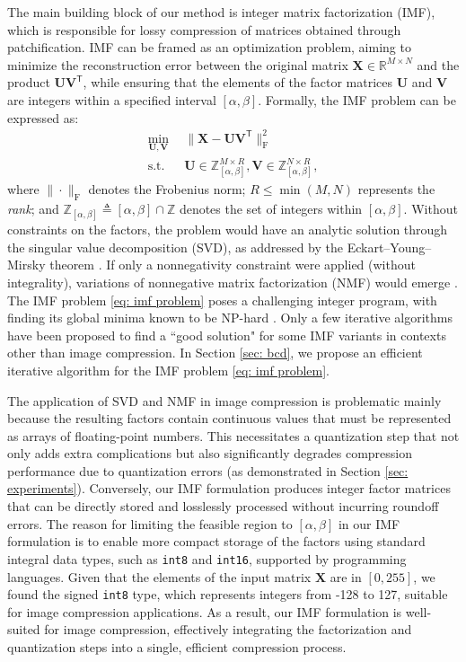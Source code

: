 The main building block of our method is integer matrix factorization (IMF), which is responsible for lossy compression of matrices obtained through patchification. IMF can be framed as an optimization problem, aiming to minimize the reconstruction error between the original matrix $\bm{X} \in \mathbb{R}^{M \times N}$ and the product $\bm{U} \bm{V}^\mathsf{T}$, while ensuring that the elements of the factor matrices $\bm{U}$ and $\bm{V}$ are integers within a specified interval $[\alpha,\beta]$. Formally, the IMF problem can be expressed as:
\begin{align} \label{eq: imf problem}
	\min_{\bm{U}, \bm{V}} & \ \  \| \bm{X} - \bm{U} \bm{V}^\mathsf{T} \|_\text{F}^2 \nonumber \\
	\text{s.t.}           & \ \ \bm{U} \in \mathbb{Z}_{[\alpha,\beta]}^{M \times R}, \bm{V} \in \mathbb{Z}_{[\alpha,\beta]}^{N \times R},
\end{align}
where $\|\cdot\|_\text{F}$ denotes the Frobenius norm; $R \leq \min(M,N)$ represents the \emph{rank}; and $\mathbb{Z}_{[\alpha,\beta]} \triangleq [\alpha,\beta] \cap \mathbb{Z}$ denotes the set of integers within $[\alpha,\beta]$. Without constraints on the factors, the problem would have an analytic solution through the singular value decomposition (SVD), as addressed by the Eckart–Young–Mirsky theorem \cite{eckart1936approximation}. If only a nonnegativity constraint were applied (without integrality), variations of nonnegative matrix factorization (NMF) would emerge \cite{lee2000algorithms, gillis2020nonnegative}. The IMF problem \eqref{eq: imf problem} poses a challenging integer program, with finding its global minima known to be NP-hard \cite{dong2018integer, van1981another}. Only a few iterative algorithms \cite{dong2018integer, lin2005integer} have been proposed to find a ``good solution" for some IMF variants in contexts other than image compression. In Section \ref{sec: bcd}, we propose an efficient iterative algorithm for the IMF problem \eqref{eq: imf problem}.

The application of SVD and NMF in image compression is problematic mainly because the resulting factors contain continuous values that must be represented as arrays of floating-point numbers. This necessitates a quantization step that not only adds extra complications but also significantly degrades compression performance due to quantization errors (as demonstrated in Section \ref{sec: experiments}). Conversely, our IMF formulation produces integer factor matrices that can be directly stored and losslessly processed without incurring roundoff errors. The reason for limiting the feasible region to $[\alpha,\beta]$ in our IMF formulation is to enable more compact storage of the factors using standard integral data types, such as \texttt{int8} and \texttt{int16}, supported by programming languages. Given that the elements of the input matrix $\bm{X}$ are in $[0, 255]$, we found the signed \texttt{int8} type, which represents integers from -128 to 127, suitable for image compression applications. As a result, our IMF formulation is well-suited for image compression, effectively integrating the factorization and quantization steps into a single, efficient compression process.


